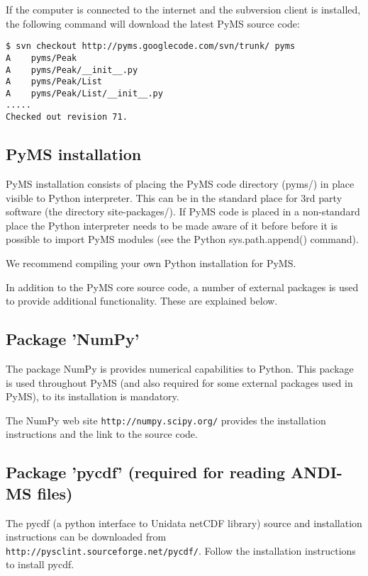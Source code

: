 If the computer is connected to the internet and the subversion client
is installed, the following command will download the latest PyMS source
code:

\begin{verbatim}
$ svn checkout http://pyms.googlecode.com/svn/trunk/ pyms
A    pyms/Peak
A    pyms/Peak/__init__.py
A    pyms/Peak/List
A    pyms/Peak/List/__init__.py
.....
Checked out revision 71.
\end{verbatim}

\subsection{PyMS installation}

PyMS installation consists of placing the PyMS code directory (pyms/) in
place visible to Python interpreter.  This can be in the standard place
for 3rd party software (the directory site-packages/). If PyMS code is
placed in a non-standard place the Python interpreter needs to be made
aware of it before before it is possible to import PyMS modules (see the
Python sys.path.append() command).

We recommend compiling your own Python installation for PyMS.

In addition to the PyMS core source code, a number of external packages
is used to provide additional functionality. These are explained below.

\subsection{\label{subsec:numpy}Package 'NumPy'}

The package NumPy is provides numerical capabilities to Python. This
package is used throughout PyMS (and also required for some external
packages used in PyMS), to its installation is mandatory.

The NumPy web site {\tt http://numpy.scipy.org/} provides the installation
instructions and the link to the source code.

\subsection{\label{subsec:pycdf}Package 'pycdf' (required for reading
ANDI-MS files)}

The pycdf (a python interface to Unidata netCDF library) source and
installation instructions can be downloaded from
{\tt http://pysclint.sourceforge.net/pycdf/}. Follow the installation
instructions to install pycdf.

